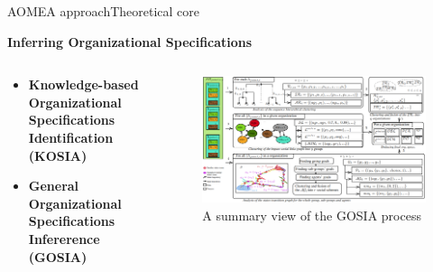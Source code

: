 \begin{frame}{AOMEA approach}{Theoretical core}

    \textbf{Inferring Organizational Specifications}

    \begin{columns}

        \begin{column}{0.3\textwidth}

            \begin{itemize}
                \item \textbf{Knowledge-based Organizational Specifications Identification (KOSIA)}
                \item \textbf{General Organizational Specifications Infererence (GOSIA)}
            \end{itemize}

        \end{column}

        \begin{column}{0.8\textwidth}
            \begin{figure}
                \centering
                \includegraphics[width=0.95\linewidth]{figures/GOSIA_view.png}
                \caption{A summary view of the GOSIA process}
                \label{fig:gosia_process}
            \end{figure}
        \end{column}

    \end{columns}





\end{frame}

